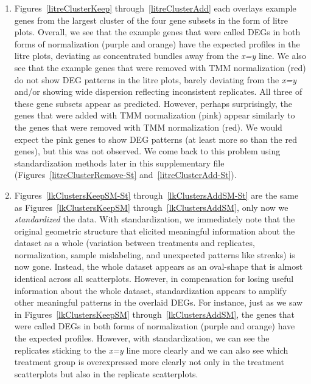 \documentclass{article}
\begin{document}
\begin{enumerate}
  \item Figures~\ref{litreClusterKeep} through~\ref{litreClusterAdd} each overlays example genes from the largest cluster of the four gene subsets in the form of litre plots. Overall, we see that the example genes that were called DEGs in both forms of normalization (purple and orange) have the expected profiles in the litre plots, deviating as concentrated bundles away from the \textit{x=y} line. We also see that the example genes that were removed with TMM normalization (red) do not show DEG patterns in the litre plots, barely deviating from the \textit{x=y} and/or showing wide dispersion reflecting inconsistent replicates. All three of these gene subsets appear as predicted. However, perhaps surprisingly, the genes that were added with TMM normalization (pink) appear similarly to the genes that were removed with TMM normalization (red). We would expect the pink genes to show DEG patterns (at least more so than the red genes), but this was not observed. We come back to this problem using standardization methods later in this supplementary file (Figures~\ref{litreClusterRemove-St} and~\ref{litreClusterAdd-St}).
  
  \item Figures~\ref{lkClustersKeepSM-St} through~\ref{lkClustersAddSM-St} are the same as Figures~\ref{lkClustersKeepSM} through~\ref{lkClustersAddSM}, only now we \textit{standardized} the data. With standardization, we immediately note that the original geometric structure that elicited meaningful information about the dataset as a whole (variation between treatments and replicates, normalization, sample mislabeling, and unexpected patterns like streaks) is now gone. Instead, the whole dataset appears as an oval-shape that is almost identical across all scatterplots. However, in compensation for losing useful information about the whole dataset, standardization appears to amplify other meaningful patterns in the overlaid DEGs. For instance, just as we saw in Figures~\ref{lkClustersKeepSM} through~\ref{lkClustersAddSM}, the genes that were called DEGs in both forms of normalization (purple and orange) have the expected profiles. However, with standardization, we can see the replicates sticking to the \textit{x=y} line more clearly and we can also see which treatment group is overexpressed more clearly not only in the treatment scatterplots but also in the replicate scatterplots.
  
  \vspace{1mm}
  

\end{enumerate}
\end{document}
